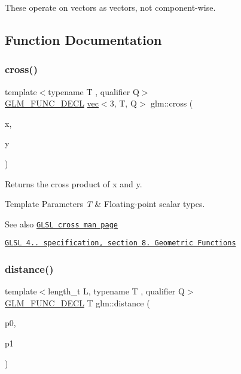 These operate on vectors as vectors, not component-\/wise. 

\subsection{Function Documentation}
\mbox{\label{group__core__func__geometric_gaeeec0794212fe84fc9d261de067c9587}} 
\subsubsection{\texorpdfstring{cross()}{cross()}}
{\footnotesize\ttfamily template$<$typename T , qualifier Q$>$ \\
\hyperlink{setup_8hpp_ab2d052de21a70539923e9bcbf6e83a51}{G\+L\+M\+\_\+\+F\+U\+N\+C\+\_\+\+D\+E\+CL} \hyperlink{structglm_1_1vec}{vec}$<$3, T, Q$>$ glm\+::cross (\begin{DoxyParamCaption}\item[{\hyperlink{structglm_1_1vec}{vec}$<$ 3, T, Q $>$ const \&}]{x,  }\item[{\hyperlink{structglm_1_1vec}{vec}$<$ 3, T, Q $>$ const \&}]{y }\end{DoxyParamCaption})}

Returns the cross product of x and y.


\begin{DoxyTemplParams}{Template Parameters}
{\em T} & Floating-\/point scalar types.\\
\hline
\end{DoxyTemplParams}
\begin{DoxySeeAlso}{See also}
\href{http://www.opengl.org/sdk/docs/manglsl/xhtml/cross.xml}{\tt G\+L\+SL cross man page} 

\href{http://www.opengl.org/registry/doc/GLSLangSpec.4.20.8.pdf}{\tt G\+L\+SL 4.. specification, section 8. Geometric Functions} 
\end{DoxySeeAlso}
\mbox{\label{group__core__func__geometric_gaa68de6c53e20dfb2dac2d20197562e3f}} 
\subsubsection{\texorpdfstring{distance()}{distance()}}
{\footnotesize\ttfamily template$<$length\+\_\+t L, typename T , qualifier Q$>$ \\
\hyperlink{setup_8hpp_ab2d052de21a70539923e9bcbf6e83a51}{G\+L\+M\+\_\+\+F\+U\+N\+C\+\_\+\+D\+E\+CL} T glm\+::distance (\begin{DoxyParamCaption}\item[{\hyperlink{structglm_1_1vec}{vec}$<$ L, T, Q $>$ const \&}]{p0,  }\item[{\hyperlink{structglm_1_1vec}{vec}$<$ L, T, Q $>$ const \&}]{p1 }\end{DoxyParamCaption})}

